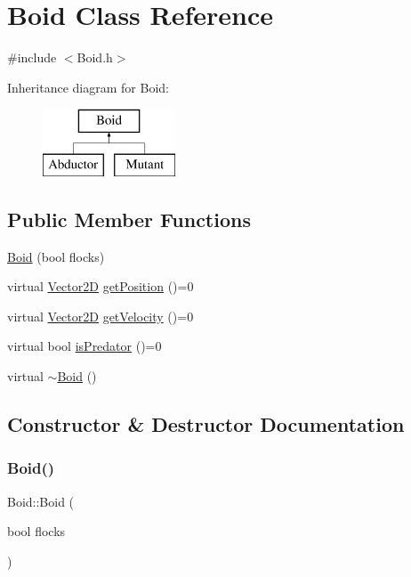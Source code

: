 \hypertarget{class_boid}{}\section{Boid Class Reference}
\label{class_boid}


{\ttfamily \#include $<$Boid.\+h$>$}

Inheritance diagram for Boid\+:\begin{figure}[H]
\begin{center}
\leavevmode
\includegraphics[height=2.000000cm]{class_boid}
\end{center}
\end{figure}
\subsection*{Public Member Functions}
\begin{DoxyCompactItemize}
\item 
\hyperlink{class_boid_ae8c6589e28ea9b0160e8403890ed2126}{Boid} (bool flocks)
\item 
virtual \hyperlink{class_vector2_d}{Vector2D} \hyperlink{class_boid_a32f7601f73e7a109bbd79d43b15d2272}{get\+Position} ()=0
\item 
virtual \hyperlink{class_vector2_d}{Vector2D} \hyperlink{class_boid_a58472dead1db1399b75090bf48184619}{get\+Velocity} ()=0
\item 
virtual bool \hyperlink{class_boid_afdc731ff7d6b7f471c202c191c4abf77}{is\+Predator} ()=0
\item 
virtual \hyperlink{class_boid_a712f84ddc1b8ad06ad7ecd6c10a1666c}{$\sim$\+Boid} ()
\end{DoxyCompactItemize}


\subsection{Constructor \& Destructor Documentation}
\hypertarget{class_boid_ae8c6589e28ea9b0160e8403890ed2126}{}\label{class_boid_ae8c6589e28ea9b0160e8403890ed2126} 
\subsubsection{\texorpdfstring{Boid()}{Boid()}}
{\footnotesize\ttfamily Boid\+::\+Boid (\begin{DoxyParamCaption}\item[{bool}]{flocks }\end{DoxyParamCaption})}

